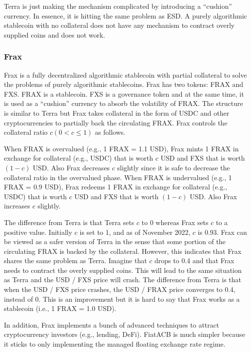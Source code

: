 \documentclass[dvipdfmx,a4paper]{article}
\begin{document}
Terra is just making the mechanism complicated by introducing a ``cushion'' currency. In essence, it is hitting the same problem as ESD. A purely algorithmic stablecoin with no collateral does not have any mechanism to contract overly supplied coins and does not work.

\subsubsection{Frax}

Frax is a fully decentralized algorithmic stablecoin with partial collateral to solve the problems of purely algorithmic stablecoins. Frax has two tokens: FRAX and FXS. FRAX is a stablecoin. FXS is a governance token and at the same time, it is used as a ``cushion'' currency to absorb the volatility of FRAX. The structure is similar to Terra but Frax takes collateral in the form of USDC and other cryptocurrencies to partially back the circulating FRAX. Frax controls the collateral ratio $c (0<c\le 1)$ as follows.

When FRAX is overvalued (e.g., 1 FRAX = 1.1 USD), Frax mints 1 FRAX in exchange for collateral (e.g., USDC) that is worth $c$ USD and FXS that is worth $(1-c)$ USD. Also Frax decreases $c$ slightly since it is safe to decrease the collateral ratio in the overvalued phase. When FRAX is undervalued (e.g., 1 FRAX = 0.9 USD), Frax redeems 1 FRAX in exchange for collateral (e.g., USDC) that is worth $c$ USD and FXS that is worth $(1-c)$ USD. Also Frax increases $c$ slightly.

The difference from Terra is that Terra sets $c$ to 0 whereas Frax sets $c$ to a positive value. Initially $c$ is set to 1, and as of November 2022, $c$ is 0.93. Frax can be viewed as a safer version of Terra in the sense that some portion of the circulating FRAX is backed by the collateral. However, this indicates that Frax shares the same problem as Terra. Imagine that $c$ drops to 0.4 and that Frax needs to contract the overly supplied coins. This will lead to the same situation as Terra and the USD / FXS price will crash. The difference from Terra is that when the USD / FXS price crashes, the USD / FRAX price converges to 0.4, instead of 0. This is an improvement but it is hard to say that Frax works as a stablecoin (i.e., 1 FRAX = 1.0 USD).

In addition, Frax implements a bunch of advanced techniques to attract cryptocurrency investors (e.g., lending, DeFi). FiatACB is much simpler because it sticks to only implementing the managed floating exchange rate regime.
\end{document}
